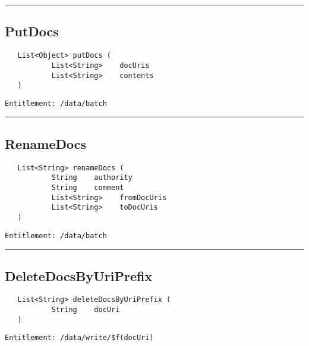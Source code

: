 \rule{12cm}{2pt}
\subsection{PutDocs}
\label{Api:PutDocs}
\begin{Verbatim}
   List<Object> putDocs (
           List<String>    docUris
           List<String>    contents
   )
\end{Verbatim}
\begin{Verbatim}[formatcom=\color{Maroon}]
  Entitlement: /data/batch
\end{Verbatim}



\rule{12cm}{2pt}
\subsection{RenameDocs}
\label{Api:RenameDocs}
\begin{Verbatim}
   List<String> renameDocs (
           String    authority
           String    comment
           List<String>    fromDocUris
           List<String>    toDocUris
   )
\end{Verbatim}
\begin{Verbatim}[formatcom=\color{Maroon}]
  Entitlement: /data/batch
\end{Verbatim}



\rule{12cm}{2pt}
\subsection{DeleteDocsByUriPrefix}
\label{Api:DeleteDocsByUriPrefix}
\begin{Verbatim}
   List<String> deleteDocsByUriPrefix (
           String    docUri
   )
\end{Verbatim}
\begin{Verbatim}[formatcom=\color{Maroon}]
  Entitlement: /data/write/$f(docUri)
\end{Verbatim}



